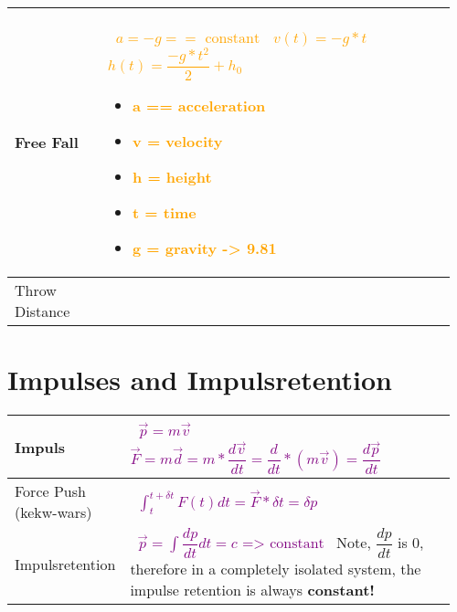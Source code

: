 \documentclass[main.tex,fontsize=8pt,paper=a4,paper=portrait,DIV=calc,]{scrartcl}
\begin{document}
\begin{table}[ht!]
\begin{tabular}{|m{0.2\linewidth}|m{0.755\linewidth}|}
\hline
Free Fall & 
\, \newline
\huge \textcolor{orange}{\( a = -g == \text{ constant} \)}\newline
\, \newline
\huge \textcolor{orange}{\(v(t) = -g * t\)}\newline
\, \newline
\huge \textcolor{orange}{\(h(t) = \dfrac{-g * t^2}{2} + h_0\)}\newline
\, \newline \normalsize
\begin{itemize}
\item \textcolor{orange}{a == acceleration}
\item \textcolor{orange}{v = velocity}
\item \textcolor{orange}{h = height}
\item \textcolor{orange}{t = time}
\item \textcolor{orange}{g = gravity -> 9.81}
\end{itemize} 
\\
\hline
Throw Distance & 

\\
\hline
\end{tabular}
\section{Impulses and Impulsretention}
\begin{tabular}{|m{0.2\linewidth}|m{0.755\linewidth}|}
\hline
Impuls & 
\, \newline
\Huge \textcolor{purple}{\( \vec{p} = m\vec{v} \)}\newline
\, \newline
\textcolor{purple}{\( \vec{F} = m\vec{d} = m * \dfrac{d\vec{v}}{dt} = \dfrac{d}{dt} * (m\vec{v}) = \dfrac{d\vec{p}}{dt} \)}\newline
\normalsize \, \newline
\\
\hline
Force Push (kekw-wars) &  
\, \newline
\Huge \textcolor{purple}{ \(\int^{t+\delta t}_{t} F(t) dt = \vec{F}* \delta t = \delta p\)}\newline
\normalsize \, \newline
\\
\hline
Impulsretention & 
\, \newline
\Huge \textcolor{purple}{ \( \vec{p} = \int \dfrac{dp}{dt} dt = c \text{ => constant}\)}\newline
\Large \, \newline
Note, \(\dfrac{dp}{dt}\) is 0, therefore in a completely isolated system, the impulse retention is always \textbf{constant!} \normalsize \newline
\\
\hline
\end{tabular}

\end{table}
\end{document}

